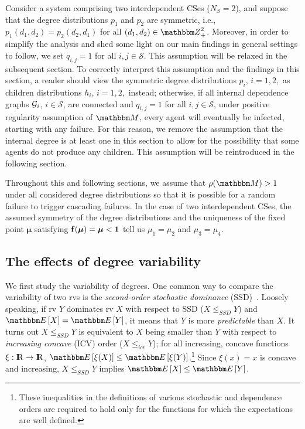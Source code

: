 \documentclass[10pt, journal, compsoc]{IEEEtran}
\newcommand {\cS}{{\mathcal{S}}}
\newcommand {\bM} {{\mathbbm M}}
\newcommand {\bff} {{\bf f}}
\newcommand {\bmu} {\boldsymbol{\mu}}
\newcommand {\Z} {{\mathbbm Z}}
\newcommand {\R} {{\rm I\kern-2.5pt R}}
\newcommand{\E}[1]{{\mathbbm E}\left[ #1 \right]}
\begin{document}
Consider a system comprising two interdependent 
CSes ($N_S = 2$), 
and suppose that the degree distributions 
$p_1$ and $p_2$ are symmetric, i.e., 
$p_1(d_1, d_2) = p_2(d_2, d_1)$ for 
all $(d_1, d_2) \in \Z_+^2$. Moreover, in order to 
simplify the analysis and shed some light on 
our main findings in general settings to follow, 
we set $q_{i,j} = 1$ for all 
$i, j \in \cS$. This assumption will be relaxed 
in the subsequent section. To 
correctly interpret this assumption 
and the findings in this section, 
a reader should view the symmetric degree 
distributions $p_i$, $i = 1, 2,$ as children 
distributions $h_i$, $i = 1, 2,$ instead; 
otherwise, if all internal dependence graphs 
${\cal G}_i$, $i \in \cS$, are connected and 
$q_{i,j} = 1$ for all $i,j \in \cS$, 
under positive regularity assumption of $\bM$, 
every agent will eventually be infected, 
starting with any failure. For this reason, 
we remove the assumption that the internal
degree is at least one in this section
to allow for the possibility that some agents
do not produce any children. This assumption
will be reintroduced in the following section.




Throughout this and following sections, 
we assume that $\rho(\bM) > 1$
under all considered degree distributions
so that it is possible for a random failure 
to trigger cascading failures. 
In the case of two interdependent CSes, 
the assumed symmetry of the degree 
distributions and the uniqueness of the 
fixed point $\bmu$ satisfying $\bff(\bmu) = 
\bmu < {\bf 1}$
tell us $\mu_1 = \mu_2$ and $\mu_3 = \mu_4$. 


\subsection{The effects of degree variability}

We first study the variability of degrees. One 
common way to compare the variability of two 
rvs is the {\em second-order stochastic
dominance} (SSD)~\cite{SO}. Loosely speaking, 
if rv $Y$ dominates rv $X$ with respect to
SSD ($X \leq_{SSD} Y$) and $\E{X} = \E{Y}$, 
it means that $Y$ is more {\em predictable}
than $X$. It turns out $X
\leq_{SSD} Y$ is equivalent to 
$X$ being smaller than $Y$ with respect to 
{\em increasing concave} (ICV) order 
($X \leq_{icv} Y$);
for all increasing, concave
functions $\xi: \R \to \R$, $\E{\xi(X)}
\leq \E{\xi(Y)}$.\footnote{These inequalities
in the definitions of various stochastic
and dependence orders are required to hold 
only for the functions
for which the expectations are well defined.} 
Since $\xi(x) = x$ is concave and
increasing, $X \leq_{SSD} Y$ implies $\E{X} 
\leq \E{Y}$.
\end{document}

